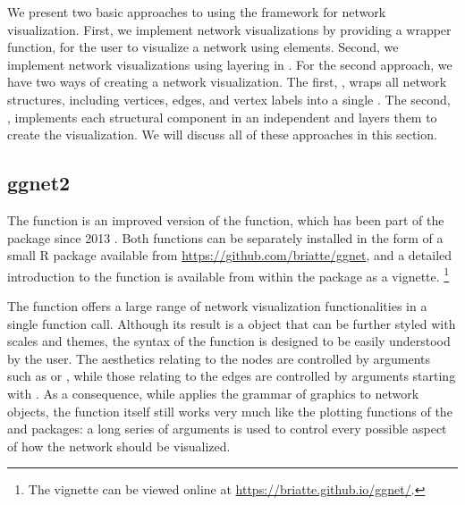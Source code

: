 We present two basic approaches to using the  framework for network visualization. First, we implement network visualizations by providing a wrapper function,  for the user to visualize a network using  elements. Second, we implement network visualizations using layering in .  For the second approach, we have two ways of creating a network visualization. The first, , wraps all network structures, including vertices, edges, and vertex labels into a single . The second, , implements each structural component in an independent  and layers them to create the visualization. We will discuss all of these approaches in this section.

\subsection{ggnet2} %

The  function is an improved version of the  function, which has been part of the  package since 2013 \citep{ggally}. Both functions can be separately installed in the form of a small R package available from \url{https://github.com/briatte/ggnet}, and a detailed introduction to the  function is available from within the package as a vignette.%
\footnote{The vignette can be viewed online at \url{https://briatte.github.io/ggnet/}.}%

The  function offers a large range of network visualization functionalities in a single function call. Although its result is a  object that can be further styled with  scales and themes, the syntax of the  function is designed to be easily understood by the user. The aesthetics relating to the nodes are controlled by arguments such as  or , while those relating to the edges are controlled by %
arguments starting with . As a consequence, while  applies the grammar of graphics to network objects, the function itself still works very much like the plotting functions of the  and  packages: a long series of arguments is used to control every possible aspect of how the network should be visualized.

